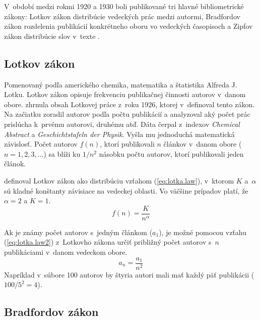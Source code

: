 V~období medzi rokmi 1920 a 1930 boli publikované tri hlavné bibliometrické
zákony: Lotkov zákon distribúcie vedeckých prác medzi autormi, Bradfordov zákon
rozdelenia publikácií konkrétneho oboru vo vedeckých časopisoch a Zipfov
zákon
distribúcie slov v~texte \citep{Bellis2009}.


\subsection{Lotkov zákon}

Pomenovaný podľa amerického chemika, matematika a štatistika Alfreda J.\,Lotku.
Lotkov zákon opisuje frekvenciu publikačnej činnosti autorov v~danom obore.
\citet{Ondrisova2011} zhrnula obsah Lotkovej práce z~roku 1926, ktorej
v~definoval tento zákon.  Na začiatku zoradil autorov podľa počtu publikácií a
analyzoval aký počet prác prislúcha k~prvému autorovi, druhému atď.  Dáta čerpal
z~indexov \emph{Chemical Abstract} a \emph{Geschichtstafeln der Physik}.  Vyšla
mu jednoduchá matematická závislosť.  Počet autorov $f(n)$, ktorí publikovali
$n$ článkov v~danom obore ($n = 1, 2, 3, \dots$) sa blíži ku $1/n^2$ násobku
počtu autorov, ktorí publikovali jeden článok.

\citet{Egghe2005} definoval Lotkov zákon ako distribúciu vzťahom
(\ref{eq:lotka.law}), v~ktorom $K$ a~$\alpha$ sú kladné konštanty závisiace
na vedeckej oblasti.  Vo väčšine prípadov platí, že $\alpha = 2$ a $K = 1$.
\begin{equation}
\label{eq:lotka.law}
f(n) = \frac{K}{n^\alpha}
\end{equation}

Ak je známy počet autorov s~jedným článkom ($a_1$), je možné pomocou vzťahu
(\ref{eq:lotka.law2}) z~Lotkovho zákona určiť približný počet autorov s~$n$
publikáciami v~danom vedeckom obore.
\begin{equation}
\label{eq:lotka.law2}
a_n = \frac{a_1}{n^2}
\end{equation}
Napríklad v~súbore 100 autorov by štyria autori mali mať každý päť publikácii
($100/5^2 = 4$).


\subsection{Bradfordov zákon}


